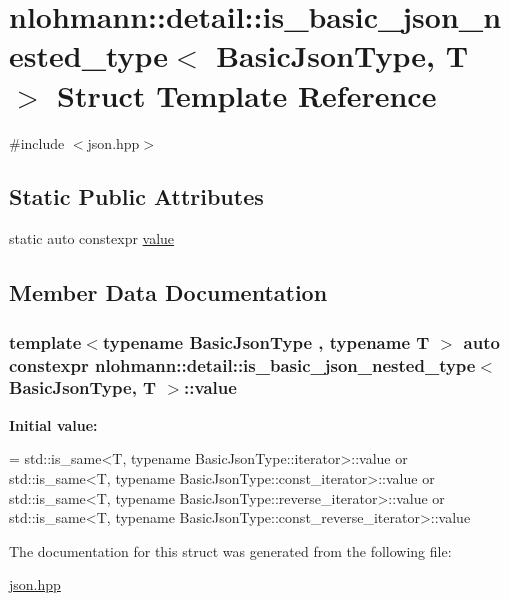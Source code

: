 \hypertarget{structnlohmann_1_1detail_1_1is__basic__json__nested__type}{}\section{nlohmann\+:\+:detail\+:\+:is\+\_\+basic\+\_\+json\+\_\+nested\+\_\+type$<$ Basic\+Json\+Type, T $>$ Struct Template Reference}
\label{structnlohmann_1_1detail_1_1is__basic__json__nested__type}


{\ttfamily \#include $<$json.\+hpp$>$}

\subsection*{Static Public Attributes}
\begin{DoxyCompactItemize}
\item 
static auto constexpr \hyperlink{structnlohmann_1_1detail_1_1is__basic__json__nested__type_aee5fee744e5298a78d557f2ee5f090db}{value}
\end{DoxyCompactItemize}


\subsection{Member Data Documentation}
\subsubsection[{\texorpdfstring{value}{value}}]{\setlength{\rightskip}{0pt plus 5cm}template$<$typename Basic\+Json\+Type , typename T $>$ auto constexpr {\bf nlohmann\+::detail\+::is\+\_\+basic\+\_\+json\+\_\+nested\+\_\+type}$<$ Basic\+Json\+Type, T $>$\+::value\hspace{0.3cm}{\ttfamily [static]}}\hypertarget{structnlohmann_1_1detail_1_1is__basic__json__nested__type_aee5fee744e5298a78d557f2ee5f090db}{}\label{structnlohmann_1_1detail_1_1is__basic__json__nested__type_aee5fee744e5298a78d557f2ee5f090db}
{\bfseries Initial value\+:}
\begin{DoxyCode}
= std::is\_same<T, typename BasicJsonType::iterator>::value or
                                  std::is\_same<T, typename BasicJsonType::const\_iterator>::value or
                                  std::is\_same<T, typename BasicJsonType::reverse\_iterator>::value or
                                  std::is\_same<T, typename BasicJsonType::const\_reverse\_iterator>::value
\end{DoxyCode}


The documentation for this struct was generated from the following file\+:\begin{DoxyCompactItemize}
\item 
\hyperlink{json_8hpp}{json.\+hpp}\end{DoxyCompactItemize}
